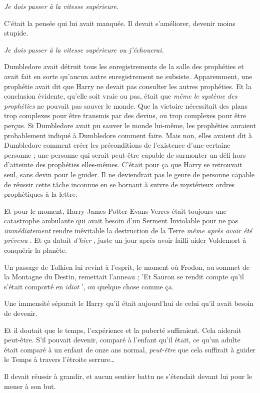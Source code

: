 \emph{Je dois passer à la vitesse supérieure.} 

C'était la pensée qui lui avait manquée. Il devait s'améliorer, devenir moins stupide.

\emph{Je dois passer à la vitesse supérieure ou j'échouerai.} 

Dumbledore avait détruit tous les enregistrements de la salle des prophéties et avait fait en sorte qu'aucun autre enregistrement ne subsiste. Apparemment, une prophétie avait dit que Harry ne devait pas consulter les autres prophéties. Et la conclusion évidente, qu'elle soit vraie ou pas, était que \emph{même le système des prophéties}  ne pouvait pas sauver le monde. Que la victoire nécessitait des plans trop complexes pour être transmis par des devins, ou trop complexes pour être perçus. Si Dumbledore avait pu sauver le monde lui-même, les prophéties auraient probablement indiqué à Dumbledore comment faire. Mais non, elles avaient dit à Dumbledore comment créer les préconditions de l'existence d'une certaine personne ; une personne qui serait peut-être capable de surmonter un défi hors d'atteinte des prophéties elles-mêmes. C'était pour ça que Harry se retrouvait seul, sans devin pour le guider. Il ne deviendrait pas le genre de personne capable de réussir cette tâche inconnue en se bornant à suivre de mystérieux ordres prophétiques à la lettre.

Et pour le moment, Harry James Potter-Evans-Verres était toujours une catastrophe ambulante qui avait besoin d'un Serment Inviolable pour ne pas \emph{immédiatement}  rendre inévitable la destruction de la Terre \emph{même après avoir été prévenu} . Et ça datait \emph{d'hier} , juste un jour après avoir failli aider Voldemort à conquérir la planète.

Un passage de Tolkien lui revint à l'esprit, le moment où Frodon, au sommet de la Montagne du Destin, remettait l'anneau ; 'Et Sauron se rendit compte qu'il s'était comporté en \emph{idiot} ', ou quelque chose comme ça.

Une immensité séparait le Harry qu'il était aujourd'hui de celui qu'il avait besoin de devenir.

Et il doutait que le temps, l'expérience et la puberté suffiraient. Cela aiderait peut-être. S'il pouvait devenir, comparé à l'enfant qu'il était, ce qu'un adulte était comparé à un enfant de onze ans normal, \emph{peut-être}  que cela suffirait à guider le Temps à travers l'étroite serrure…

Il devait réussir à grandir, et aucun sentier battu ne s'étendait devant lui pour le mener à son but.

